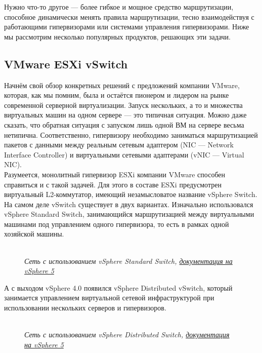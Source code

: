 \documentclass[14pt, a4paper]{article}
\begin{document}
Нужно что-то другое — более гибкое и мощное средство маршрутизации, способное динамически
менять правила маршрутизации, тесно взаимодействуя с работающими гипервизорами или
системами управления гипервизорами. Ниже мы рассмотрим несколько популярных продуктов,
решающих эти задачи.

\newpage

\subsection*{VMware ESXi vSwitch} 

Начнём свой обзор конкретных решений с предложений компании VMware, которая, как мы помним,
была и остаётся пионером и лидером на рынке современной серверной виртуализации. Запуск
нескольких, а то и множества виртуальных машин на одном сервере — это типичная ситуация. Можно
даже сказать, что обратная ситуация с запуском лишь одной ВМ на сервере весьма нетипична.
Соответственно, гипервизору необходимо заниматься маршрутизацией пакетов с данными между
реальным сетевым адаптером (NIC — Network Interface Controller) и виртуальными сетевыми
адаптерами (vNIC — Virtual NIC).\\

Разумеется, монолитный гипервизор ESXi компании VMware способен справиться и с такой задачей.
Для этого в составе ESXi предусмотрен виртуальный L2-коммутатор, имеющий незамысловатое
название vSphere Switch. На самом деле vSwitch существует в двух вариантах. Изначально
использовался vSphere Standard Switch, занимающийся маршрутизацией между виртуальными
машинами под управлением одного гипервизора, то есть в рамках одной хозяйской машины.

\begin{figure}[h]
    \centering
    \\ 
    \small\textit{Сеть с использованием vSphere Standard Switch, \href{https://docs.vmware.com/en/VMware-vSphere/index.html}{документация на vSphere 5}}  
    \label{framework} 
\end{figure}

А с выходом vSphere 4.0 появился vSphere Distributed vSwitch, который занимается управлением
виртуальной сетевой инфраструктурой при использовании нескольких серверов и гипервизоров.

\newpage

\begin{figure}[h]
    \centering
     \\
    \small\textit{Сеть с использованием vSphere Distributed Switch, \href{https://docs.vmware.com/en/VMware-vSphere/index.html}{документация на vSphere 5}} 
    \label{framework} 
\end{figure}
\end{document}
